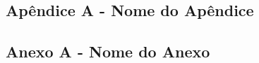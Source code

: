 \documentclass[
	12pt,				%
	oneside,   	        %
	a4paper,			%
	english,			%
	french,				%
	spanish,			%
	brazil,				%
	]{pacotes/abntex2}
\begin{document}
\postextual
\renewcommand{\bibsection}{%
\section{\bibname}
\bibmark
\prebibhook}






\begin{apendicesenv}

\section*{Apêndice A - Nome do Apêndice}

\end{apendicesenv}



\begin{anexosenv}

\section*{Anexo A - Nome do Anexo}
\end{anexosenv}
\end{document}
